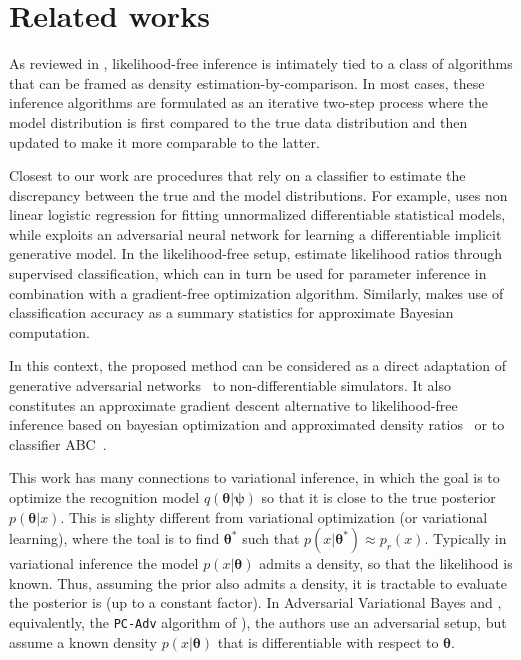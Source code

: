 \documentclass[twocolumn,superscriptaddress,aps]{revtex4-1}
\newcommand{\bftheta}{{\bm \theta}}
\newcommand{\bfpsi}{{\bm \psi}}
\theoremstyle{plain}
\begin{document}

\section{Related works}

As reviewed in \cite{2016arXiv161003483M}, likelihood-free inference is
intimately tied to a class of algorithms that can be framed as density
estimation-by-comparison. In most cases, these inference algorithms are
formulated as an iterative two-step process where the model distribution is
first compared to the true data distribution and then updated to make it more
comparable to the latter.

Closest to our work are procedures that rely on a classifier to estimate the
discrepancy between the true and the model distributions. For example,
\citep{gutmann2012noise} uses non linear logistic regression for fitting
unnormalized differentiable statistical models, while
\citep{goodfellow2014generative} exploits an adversarial neural network for
learning a differentiable implicit generative model. In the likelihood-free
setup, \citep{cranmer2015approximating,cranmer2016experiments,2016arXiv161110242D} estimate likelihood
ratios through supervised classification, which can in turn be used for
parameter inference in combination with a gradient-free optimization algorithm.
Similarly, \citep{gutmann2017likelihood} makes use of classification accuracy as
a summary statistics for approximate Bayesian computation.

\citep{meeds2015hamiltonian}

In this context, the proposed method can be considered as a direct adaptation of
generative adversarial networks~\citep{goodfellow2014generative} to
non-differentiable simulators. It also constitutes an approximate gradient
descent alternative to likelihood-free inference based on bayesian optimization and approximated density
ratios~\citep{cranmer2015approximating,cranmer2016experiments} or to classifier
ABC~\citep{gutmann2017likelihood}.

This work has many connections to variational inference, in which the goal is to optimize the recognition model $q(\bftheta|\bfpsi)$ so that it is close to the true posterior $p(\bftheta|x)$. This is slighty different from variational optimization (or variational learning), where the toal is to find $\bftheta^*$ such that $p(x|\bftheta^*) \approx p_r(x)$.  Typically in variational inference the model $p(x|\bftheta)$ admits a density, so that the likelihood is known. Thus, assuming the prior also admits a density, it is tractable to evaluate the posterior is (up to a constant factor). In Adversarial Variational Bayes \citep{DBLP:journals/corr/MeschederNG17} and , equivalently, the \texttt{PC-Adv} algorithm of  \citep{2017arXiv170208235H}), the authors use an adversarial setup, but assume a known density $p(x|\bftheta)$ that is differentiable with respect to $\bftheta$. 
\end{document}

